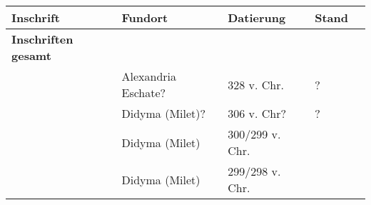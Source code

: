 \documentclass[a4paper, 12pt]{scrarticle}
\begin{document}
\begin{longtable}{lllll}

        Inschrift & Fundort & Datierung & Stand \\
        \hline
\endhead


        \textbf{Inschriften gesamt} &
        &
        &
        \cellcolor{white}\\

		\citetitle[391]{ieog}&
		Alexandria Eschate?&
		328 v. Chr.&
		\cellcolor{white} ? \\

		\citetitle[392]{ieog}&
		Didyma (Milet)?&
		306 v. Chr?&
		\cellcolor{white} ?\\

		\citetitle[393]{ieog}&
		Didyma (Milet)&
		300/299 v. Chr.&
		\cellcolor{white}\\

		\citetitle[394]{ieog}&
		Didyma (Milet)&
		299/298 v. Chr.&
		\cellcolor{white}\\

\end{longtable}

\printbibliography
\end{document}

